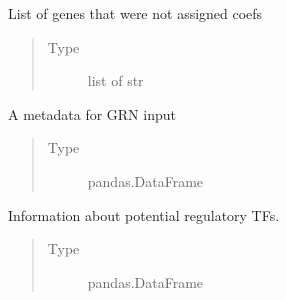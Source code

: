 \documentclass[letterpaper,10pt,english]{sphinxmanual}
\begin{document}
\begin{fulllineitems}
\begin{fulllineitems}
\begin{quote}
\begin{description}
\end{description}\end{quote}

\end{fulllineitems}


\begin{fulllineitems}
\label{\detokenize{modules/celloracle:celloracle.Net.failed_genes}}
List of genes that were not assigned coefs
\begin{quote}\begin{description}
\item[{Type}] \leavevmode
list of str

\end{description}\end{quote}

\end{fulllineitems}


\begin{fulllineitems}
\label{\detokenize{modules/celloracle:celloracle.Net.cellstate}}
A metadata for GRN input
\begin{quote}\begin{description}
\item[{Type}] \leavevmode
pandas.DataFrame

\end{description}\end{quote}

\end{fulllineitems}


\begin{fulllineitems}
\label{\detokenize{modules/celloracle:celloracle.Net.TFinfo}}
Information about potential regulatory TFs.
\begin{quote}\begin{description}
\item[{Type}] \leavevmode
pandas.DataFrame

\end{description}\end{quote}


\end{fulllineitems}
\end{fulllineitems}
\end{document}
